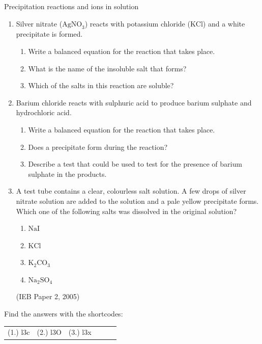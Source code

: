             \begin{exercises}{Precipitation reactions and ions in solution }
            \nopagebreak
            \label{m38719*id341939}\begin{enumerate}[noitemsep, label=\textbf{\arabic*}. ] 
            \label{m38719*uid74}\item Silver nitrate (${\mathrm{AgNO}}_{3}$) reacts with potassium chloride ($\mathrm{KCl}$) and a white precipitate is formed.
\label{m38719*id341969}\begin{enumerate}[noitemsep, label=\textbf{\alph*}. ] 
            \label{m38719*uid75}\item Write a balanced equation for the reaction that takes place.
\label{m38719*uid76}\item What is the name of the insoluble salt that forms?
\label{m38719*uid77}\item Which of the salts in this reaction are soluble?
\end{enumerate}
\label{m38719*uid78}\item Barium chloride reacts with sulphuric acid to produce barium sulphate and hydrochloric acid.
\label{m38719*id342022}\begin{enumerate}[noitemsep, label=\textbf{\alph*}. ] 
            \label{m38719*uid79}\item Write a balanced equation for the reaction that takes place.
\label{m38719*uid80}\item Does a precipitate form during the reaction?
\label{m38719*uid81}\item Describe a test that could be used to test for the presence of barium sulphate in the products.
\end{enumerate}
\label{m38719*uid82}\item A test tube contains a clear, colourless salt solution. A few drops of silver nitrate solution are added to the solution and a pale yellow precipitate forms. Which one of the following salts was dissolved in the original solution?
\label{m38719*id342078}\begin{enumerate}[noitemsep, label=\textbf{\alph*}. ] 
            \label{m38719*uid83}\item $\mathrm{NaI}$
\label{m38719*uid84}\item $\mathrm{KCl}$
\label{m38719*uid85}\item ${\mathrm{K}}_{2}{\mathrm{CO}}_{3}$\label{m38719*uid86}\item ${\mathrm{Na}}_{2}{\mathrm{SO}}_{4}$\end{enumerate}
(IEB Paper 2, 2005)\newline
\end{enumerate}
    \label{m38719*fs-id1165446821271}
\par {} Find the answers with the shortcodes:
 \par \begin{tabular}[h]{cccccc}
 (1.) l3c  &  (2.) l3O  &  (3.) l3x  & \end{tabular}
\end{exercises}
